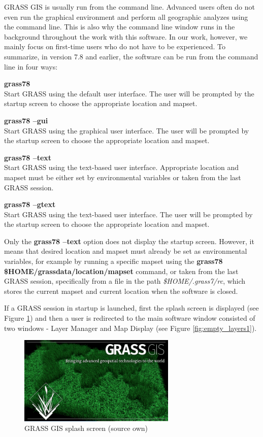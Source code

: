 \documentclass[a4paper,10pt,twoside]{article}
\begin{document}
\noindent GRASS GIS is usually run from the command line. Advanced users often do not even run the graphical environment and perform all geographic analyzes using the command line. This is also why the command line window runs in the background throughout the work with this software. In our work, however, we mainly focus on first-time users who do not have to be experienced. To summarize, in version 7.8 and earlier, the software can be run from the command line in four ways:

\noindent \textbf{grass78} \\
\noindent Start GRASS using the default user interface. The user will be prompted by the startup screen to choose the appropriate location and mapset.

\noindent \textbf{grass78 --gui}\\
\noindent Start GRASS using the graphical user interface. The user will be prompted by the startup screen to choose the appropriate location and mapset.

\noindent \textbf{grass78 --text} \\
\noindent Start GRASS using the text-based user interface. Appropriate location and mapset must be either set by environmental variables or taken from the last GRASS session.

\noindent \textbf{grass78 --gtext} \\
\noindent Start GRASS using the text-based user interface. The user will be prompted by the startup screen to choose the appropriate location and mapset.

Only the \textbf{grass78 --text} option does not display the startup screen. However, it means that desired location and mapset must already be set as environmental variables, for example by running a specific mapset using the \textbf{grass78 \$HOME/grassdata/location/mapset} command, or taken from the last GRASS session, specifically from a file in the path \textit{\$HOME/.grass7/rc}, which stores the current mapset and current location when the software is closed.

If a GRASS session in startup is launched, first the splash screen is displayed (see Figure \ref{fig:splash_screen}) and then a user is redirected to the main software window consisted of two windows - Layer Manager and Map Display (see Figure \ref{fig:empty_layers1}). 

\vspace{0.3cm}
\begin{figure}[hbt!] 
\begin{center}
\includegraphics[width=7.5cm]{../pictures/splash_screen.png} 
\caption[GRASS GIS splash screen]{GRASS GIS splash screen (source own)}
\label{fig:splash_screen}
\end{center}
\end{figure}
\end{document}
